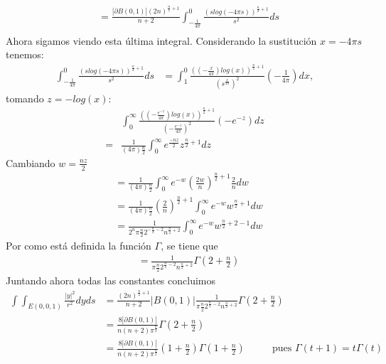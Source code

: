 \begin{homeworkProblem}
\begin{solucion}
\begin{align*}
      &= \frac{|\partial B(0,1)|(2n)^{\frac{n}{2} + 1}}{n+2} \int_{-\frac{1}{4\pi}}^{0} \frac{(slog(-4\pi s))^{\frac{n}{2} + 1}}{s^{2}} ds\\ 
    \end{align*}
    Ahora sigamos viendo esta última integral. Considerando la sustitución $x = -4\pi s$ tenemos:
    \begin{align*}
      \int_{-\frac{1}{4\pi}}^{0} \frac{(slog(-4\pi s))^{\frac{n}{2} + 1}}{s^{2}} ds &= \int_{1}^{0} \frac{((-\frac{x}{4\pi})log(x))^{\frac{n}{2}+1}}{(s^\frac{x}{4\pi})^{2}}(- \frac{1}{4\pi})dx,
    \end{align*}
    tomando $z = -log(x)$:
    \begin{align*}
      &\int_{0}^{\infty} \frac{((-\frac{e^{-z}}{4\pi})log(x))^{\frac{n}{2}+1}}{(-\frac{e^{-z}}{4\pi})^{2}}(-e^{-z})dz\\
      =& \frac{1}{(4\pi){\frac{n}{2}}} \int_{0}^{\infty} e^{\frac{-nz}{2}}z^{\frac{n}{2}+1}dz
    \end{align*}
    Cambiando $w=\frac{nz}{2}$
    \begin{align*}
      &= \frac{1}{(4\pi){\frac{n}{2}}} \int_{0}^{\infty} e^{-w}(\frac{2w}{n})^{\frac{n}{2}+1}\frac{2}{n}dw\\ 
      &= \frac{1}{(4\pi){\frac{n}{2}}} (\frac{2}{n})^{\frac{n}{2}+1} \int_{0}^{\infty} e^{-w} w^{\frac{n}{2}+1}dw\\ 
      &= \frac{1}{2^{n} \pi{\frac{n}{2}} 2^{-\frac{n}{2}-2} n^{\frac{n}{2}+2}} \int_{0}^{\infty} e^{-w} w^{\frac{n}{2}+2-1}dw  
    \end{align*}
    Por como está definida la función $\Gamma$, se tiene que
    \begin{align*}
      &= \frac{1}{\pi{\frac{n}{2}} 2^{\frac{n}{2}-2} n^{\frac{n}{2}+2}} \Gamma (2 + \frac{n}{2})
    \end{align*}
    Juntando ahora todas las constantes concluimos
    \begin{align*}
      \int \int_{E(0,0,1)} \frac{|y|^{2}}{r^{2}} dyds &= \frac{(2n)^{\frac{n}{2} + 1}}{n+2} |B(0,1)| \frac{1}{\pi{\frac{n}{2}} 2^{\frac{n}{2}-2} n^{\frac{n}{2}+2}} \Gamma (2 + \frac{n}{2})\\ 
      &= \frac{8|\partial B(0,1)|}{n(n+2) \pi^{\frac{n}{2}}} \Gamma (2 + \frac{n}{2})\\ 
      &= \frac{8|\partial B(0,1)|}{n(n+2) \pi^{\frac{n}{2}}} (1 + \frac{n}{2}) \Gamma (1 + \frac{n}{2}) \hspace{1cm} \text{ pues } \Gamma(t+1) = t \Gamma(t)\\

\end{align*}
\end{solucion}
\end{homeworkProblem}

